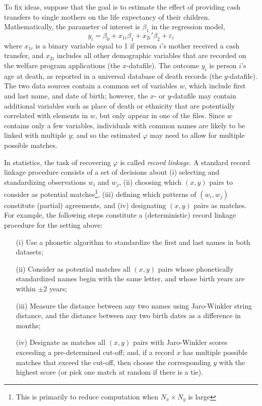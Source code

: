 \documentclass[12pt]{article}
\begin{document}
To fix ideas, suppose that the goal is to estimate the effect of providing cash transfers to single mothers on the life expectancy of their children.  Mathematically, the parameter of interest is $\beta_1$ in the regression model,
\begin{equation}
y_i = \beta_0 + x_{1i}  \beta_1+ x_{2i}'\beta_2 + \varepsilon_i
\end{equation}
where $x_{1i}$ is a binary variable equal to 1 if person $i$'s mother received a cash transfer, and $x_{2i}$ includes all other demographic variables that are recorded on the welfare program applications (the $x$-datafile).  The outcome $y_i$ is person $i$'s age at death, as reported in a universal database of death records (the $y$-datafile).  The two data sources  contain a common set of variables $w$, which include first and last name, and date of birth; however, the $x$- or $y$-datafile may contain additional variables such as place of death or ethnicity that are potentially correlated with elements in $w$, but only appear in one of the files.  Since $w$ contains only a few variables, individuals with common names are likely to be linked with multiple $y$; and so the estimated $\varphi$ may need to allow for multiple possible matches.   

In statistics, the task of recovering $\varphi$ is called \textit{record linkage}.  A standard record linkage procedure consists of a set of decisions about (i) selecting and standardizing observations $w_i$ and $w_j$, (ii) choosing which $(x,y)$ pairs to consider as potential matches\footnote{This is primarily to reduce computation when $N_x \times N_y$ is large}, (iii) defining which patterns of $(w_i,w_j)$ constitute (partial) agreements, and (iv) designating $(x,y)$ pairs as matches.  For example, the following steps constitute a (deterministic) record linkage procedure for the setting above: 
\begin{enumerate}
\item[(i)] Use a phonetic algorithm to standardize the first and last names in both datasets; 
\item[(ii)] Consider as potential matches all $(x, y)$ pairs whose phonetically standardized names begin with the same letter, and whose birth years are within $\pm$2 years;
\item[(iii)] Measure the distance between any two names using Jaro-Winkler string distance, and the distance between any two birth dates as a difference in months;
\item[(iv)] Designate as matches all $(x,y)$ pairs with Jaro-Winkler scores exceeding a pre-determined cut-off; and, if a record $x$ has multiple possible matches that exceed the cut-off, then choose the corresponding $y$ with the highest score (or pick one match at random if there is a tie).  
\end{enumerate}
\end{document}
